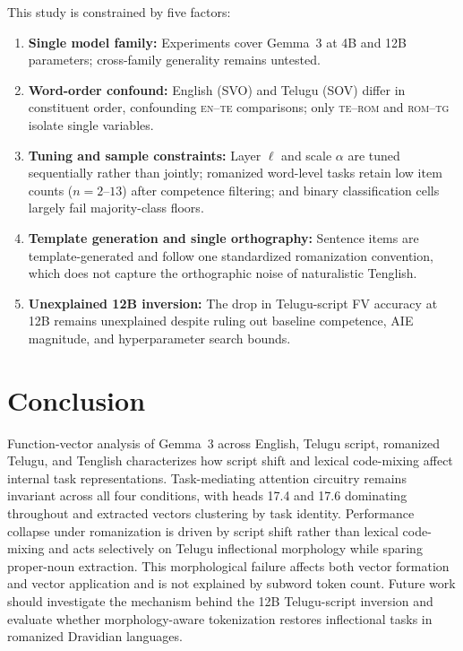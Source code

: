 \documentclass[11pt]{article}
\newcommand{\cond}[1]{\textsc{#1}}
\begin{document}
This study is constrained by five factors:
\begin{enumerate}
  \item \textbf{Single model family:} Experiments cover Gemma~3 at 4B and 12B
    parameters; cross-family generality remains untested.
  \item \textbf{Word-order confound:} English (SVO) and Telugu (SOV) differ in
    constituent order, confounding \cond{en}--\cond{te} comparisons; only
    \cond{te}--\cond{rom} and \cond{rom}--\cond{tg} isolate single variables.
  \item \textbf{Tuning and sample constraints:} Layer $\ell$ and scale $\alpha$
    are tuned sequentially rather than jointly; romanized word-level tasks
    retain low item counts ($n = 2$--$13$) after competence filtering; and
    binary classification cells largely fail majority-class floors.
  \item \textbf{Template generation and single orthography:} Sentence items are
    template-generated and follow one standardized romanization convention,
    which does not capture the orthographic noise of naturalistic Tenglish.
  \item \textbf{Unexplained 12B inversion:} The drop in Telugu-script FV
    accuracy at 12B remains unexplained despite ruling out baseline competence,
    AIE magnitude, and hyperparameter search bounds.
\end{enumerate}

\section{Conclusion}

Function-vector analysis of Gemma~3 across English, Telugu script, romanized
Telugu, and Tenglish characterizes how script shift and lexical code-mixing
affect internal task representations. Task-mediating attention circuitry remains invariant across all four
conditions, with heads 17.4 and 17.6 dominating throughout and extracted
vectors clustering by task identity. Performance collapse under romanization is
driven by script shift rather than lexical code-mixing and acts selectively on
Telugu inflectional morphology while sparing proper-noun extraction. This
morphological failure affects both vector formation and vector application and
is not explained by subword token count. Future work should investigate the
mechanism behind the 12B Telugu-script inversion and evaluate whether
morphology-aware tokenization restores inflectional tasks in romanized
Dravidian languages.
\end{document}

